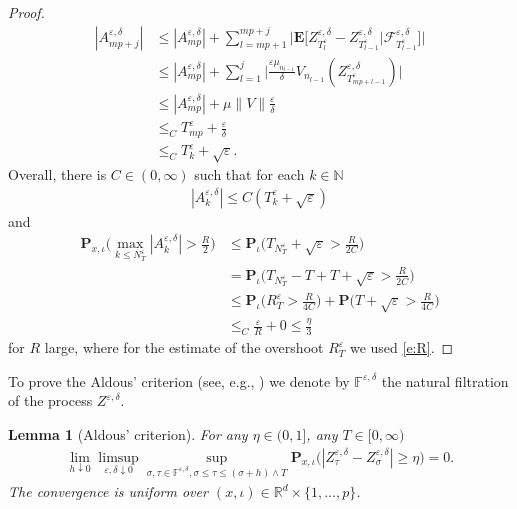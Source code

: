 \documentclass[10pt]{article}
\newcommand{\E}{\mathbf{E}}
\renewcommand{\P}{\mathbf{P}}
\newcommand{\1}{1\!\!\!\;{\rm I}}
\theoremstyle{plain}
\newtheorem{lem}[thm]{Lemma}
\theoremstyle{definition}
\newcommand{\e}{\varepsilon}
\newcommand{\ba}{\begin{equation}\begin{aligned}}
\newcommand{\ea}{\end{aligned}\end{equation}}
\newcommand{\rF}{\mathscr{F}}
\numberwithin{equation}{section}
\begin{document}
\begin{proof}
\ba
|A_{mp+j}^{\e,\delta}|
&\leq |A_{mp}^{\e,\delta}|
+\sum_{l=mp+1}^{mp+j} \Big|\E \Big[ Z^{\e,\delta}_{T^\e_l}- Z^{\e,\delta}_{T^\e_{l-1}}\Big|\rF^{\e,\delta}_{T^\e_{l-1}}  \Big]\Big|\\
&\leq
|A_{mp}^{\e,\delta}|
+ \sum_{l=1}^{j}\Big|
\frac{\e \mu_{n_{l-1}}}{\delta}V_{n_{l-1}}(Z^{\e,\delta}_{T^\e_{mp+l-1}} )\Big|\\
&\leq |A_{mp}^{\e,\delta}| +  \mu\|V\| \frac{\e}{\delta}\\
&\leq_C T_{mp}^\e + \frac{\e}{\delta}\\
&\leq_C T_{k}^\e +\sqrt{\e}.
\ea
Overall, there is $C\in (0,\infty)$ such that for each $k\in\mathbb N$
\ba
\label{e:e3}
|A_{k}^{\e,\delta}|\leq C( T_k^\e + \sqrt{\e})
\ea
and
\ba
\label{e:A}
\P_{x,\iota}\Big(\max_{k\leq N^\e_T }|A_k^{\e,\delta}|> \frac{R}{2}\Big)
&\leq \P_\iota\Big(T_{N_T^\e} +\sqrt{\e}> \frac{R}{2C}\Big)\\
&=\P_\iota\Big(T_{N_T^\e}-T + T +\sqrt{\e}> \frac{R}{2C}\Big)\\
&\leq \P_\iota\Big(R^\e_T > \frac{R}{4C}\Big) + \P\Big(T + \sqrt{\e}> \frac{R}{4C}\Big)\\
&\leq_C \frac{\e}{R}+0\leq \frac{\eta}{3}
\ea
for $R$ large, where for the estimate of the overshoot $R^\e_T$ we used \eqref{e:R}.
\end{proof}

To prove the Aldous' criterion (see, e.g.,  \cite[\S 4a, Chapter VI]{JacodS-03}) we denote by $\mathbb F^{\e,\delta}$
the natural filtration of the process $Z^{\e,\delta}$.

\begin{lem}[Aldous' criterion]
\label{l:aldous}
For any $\eta\in(0,1]$, any $T\in[0,\infty)$
\ba
\lim_{h\downarrow 0}\limsup_{\e,\delta\downarrow 0}
\sup_{\sigma,\tau\in\mathbb F^{\e,\delta},
\sigma\leq\tau\leq(\sigma+h)\wedge T}
\P_{x,\iota}\Big(|Z^{\e,\delta}_\tau-Z^{\e,\delta}_\sigma|\geq\eta\Big)=0.
\ea
The convergence is uniform over
$(x,\iota)\in\mathbb R^d\times\{1,\dots,p\}$.
\end{lem}
\end{document}
